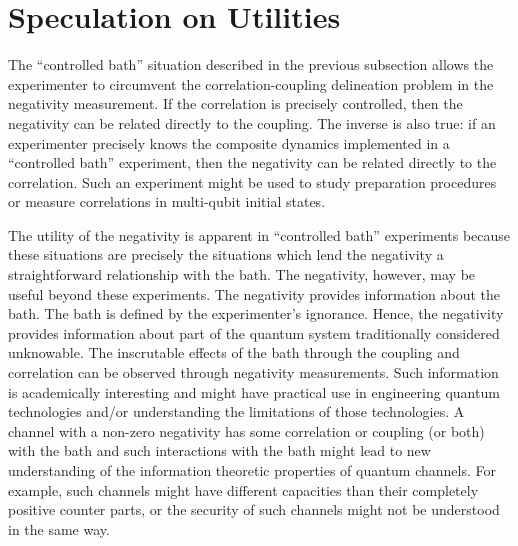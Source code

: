 \section{Speculation on Utilities}

The ``controlled bath'' situation described in the previous subsection allows the experimenter to circumvent the correlation-coupling delineation problem in the negativity measurement.  If the correlation is precisely controlled, then the negativity can be related directly to the coupling.  The inverse is also true: if an experimenter precisely knows the composite dynamics implemented in a ``controlled bath'' experiment, then the negativity can be related directly to the correlation.  Such an experiment might be used to study preparation procedures or measure correlations in multi-qubit initial states.  

The utility of the negativity is apparent in ``controlled bath'' experiments because these situations are precisely the situations which lend the negativity a straightforward relationship with the bath.  The negativity, however, may be useful beyond these experiments.  The negativity provides information about the bath.  The bath is defined by the experimenter's ignorance.  Hence, the negativity provides information about part of the quantum system traditionally considered unknowable.  The inscrutable effects of the bath through the coupling and correlation can be observed through negativity measurements.  Such information is academically interesting and might have practical use in engineering quantum technologies and/or understanding the limitations of those technologies.  A channel with a non-zero negativity has some correlation or coupling (or both) with the bath and such interactions with the bath might lead to new understanding of the information theoretic properties of quantum channels.  For example, such channels might have different capacities than their completely positive counter parts, or the security of such channels might not be understood in the same way.



